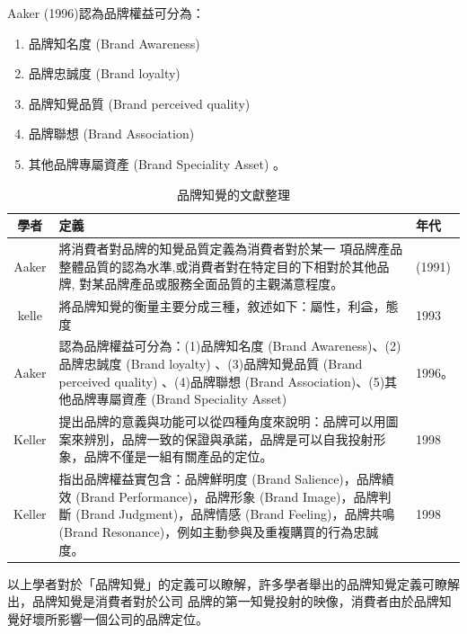 Aaker (1996)認為品牌權益可分為\cite{Aaker1996}：
\begin{enumerate}
\item 品牌知名度 (Brand Awareness)
\item 品牌忠誠度 (Brand loyalty) 
\item 品牌知覺品質 (Brand perceived quality) 
\item 品牌聯想 (Brand Association)
\item 其他品牌專屬資產 (Brand Speciality Asset) 。
\end{enumerate}





\begin{table}[htb]
\caption{品牌知覺的文獻整理}
\label{tab:PL2}
\centering
%
\begin{tabular}[t]{|c|p{8.5cm}|p{2.5cm}|} %
\hline
學者&定義 & 年代 \tabularnewline
\hline
Aaker & 將消費者對品牌的知覺品質定義為消費者對於某一 項品牌產品整體品質的認為水準,或消費者對在特定目的下相對於其他品牌, 對某品牌產品或服務全面品質的主觀滿意程度。& (1991)  \tabularnewline
\hline
kelle&將品牌知覺的衡量主要分成三種，敘述如下：屬性，利益，態度& 1993 \tabularnewline
\hline
Aaker&認為品牌權益可分為：(1)品牌知名度 (Brand Awareness)、(2)品牌忠誠度 (Brand loyalty) 、(3)品牌知覺品質 (Brand perceived quality) 、(4)品牌聯想 (Brand Association)、(5)其他品牌專屬資產 (Brand Speciality Asset) &1996。\tabularnewline
\hline
Keller&提出品牌的意義與功能可以從四種角度來說明：品牌可以用圖案來辨別，品牌一致的保證與承諾，品牌是可以自我投射形象，品牌不僅是一組有關產品的定位。&1998 \tabularnewline
\hline
Keller&指出品牌權益實包含：品牌鮮明度 (Brand Salience)，品牌績效 (Brand Performance)，品牌形象 (Brand Image)，品牌判斷 (Brand Judgment)，品牌情感 (Brand Feeling)，品牌共鳴 (Brand Resonance)，例如主動參與及重複購買的行為忠誠度。&1998 \tabularnewline
\hline
\end{tabular}
\end{table}
以上學者對於「品牌知覺」的定義可以瞭解，許多學者舉出的品牌知覺定義可瞭解出，品牌知覺是消費者對於公司 品牌的第一知覺投射的映像，消費者由於品牌知覺好壞所影響一個公司的品牌定位。


